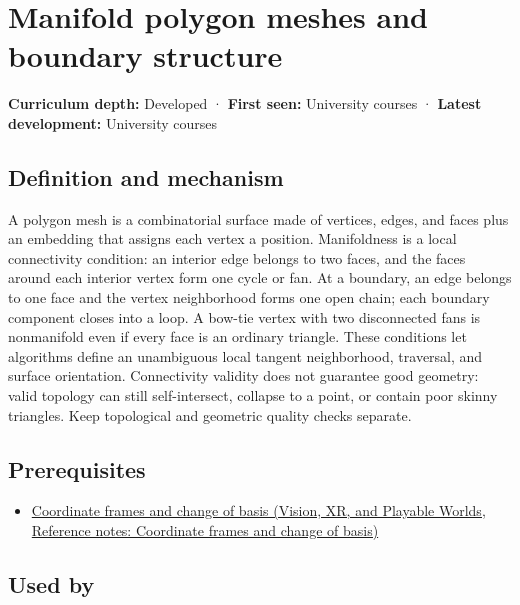 \hypertarget{appendix-fab348609369}{}\label{referencestart:appendix-fab348609369}
\section{Manifold polygon meshes and boundary structure}\label{appendix-fab348609369-manifold-polygon-meshes-and-boundary-structure}

\textbf{Curriculum depth:} Developed · \textbf{First seen:} University courses · \textbf{Latest development:} University courses

\subsection{Definition and mechanism}\label{appendix-fab348609369-definition-and-mechanism}

A polygon mesh is a combinatorial surface made of vertices, edges, and faces plus an embedding that assigns each vertex a position. Manifoldness is a local connectivity condition: an interior edge belongs to two faces, and the faces around each interior vertex form one cycle or fan. At a boundary, an edge belongs to one face and the vertex neighborhood forms one open chain; each boundary component closes into a loop. A bow-tie vertex with two disconnected fans is nonmanifold even if every face is an ordinary triangle. These conditions let algorithms define an unambiguous local tangent neighborhood, traversal, and surface orientation. Connectivity validity does not guarantee good geometry: valid topology can still self-intersect, collapse to a point, or contain poor skinny triangles. Keep topological and geometric quality checks separate.

\subsection{Prerequisites}\label{appendix-fab348609369-prerequisites}

\begin{itemize}
\tightlist
\item
  \href{../07-Vision-XR-and-Playable-Worlds/main.pdf\#nameddest=appendix-1bae9457dbc3}{Coordinate frames and change of basis (Vision, XR, and Playable Worlds, Reference notes: Coordinate frames and change of basis)}
\end{itemize}

\subsection{Used by}\label{appendix-fab348609369-used-by}

